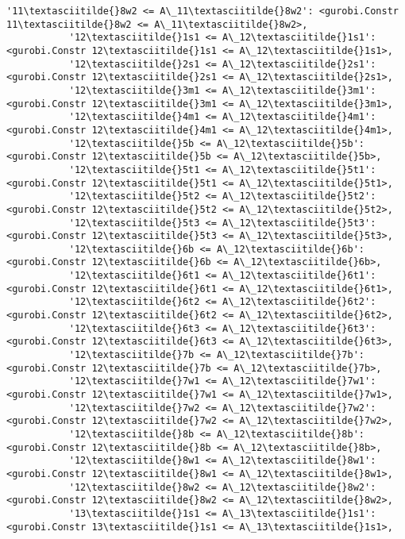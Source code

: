 \documentclass[11pt]{article}
\begin{document}
\begin{Verbatim}[commandchars=\\\{\}]
           '11\textasciitilde{}8w2 <= A\_11\textasciitilde{}8w2': <gurobi.Constr 11\textasciitilde{}8w2 <= A\_11\textasciitilde{}8w2>,
           '12\textasciitilde{}1s1 <= A\_12\textasciitilde{}1s1': <gurobi.Constr 12\textasciitilde{}1s1 <= A\_12\textasciitilde{}1s1>,
           '12\textasciitilde{}2s1 <= A\_12\textasciitilde{}2s1': <gurobi.Constr 12\textasciitilde{}2s1 <= A\_12\textasciitilde{}2s1>,
           '12\textasciitilde{}3m1 <= A\_12\textasciitilde{}3m1': <gurobi.Constr 12\textasciitilde{}3m1 <= A\_12\textasciitilde{}3m1>,
           '12\textasciitilde{}4m1 <= A\_12\textasciitilde{}4m1': <gurobi.Constr 12\textasciitilde{}4m1 <= A\_12\textasciitilde{}4m1>,
           '12\textasciitilde{}5b <= A\_12\textasciitilde{}5b': <gurobi.Constr 12\textasciitilde{}5b <= A\_12\textasciitilde{}5b>,
           '12\textasciitilde{}5t1 <= A\_12\textasciitilde{}5t1': <gurobi.Constr 12\textasciitilde{}5t1 <= A\_12\textasciitilde{}5t1>,
           '12\textasciitilde{}5t2 <= A\_12\textasciitilde{}5t2': <gurobi.Constr 12\textasciitilde{}5t2 <= A\_12\textasciitilde{}5t2>,
           '12\textasciitilde{}5t3 <= A\_12\textasciitilde{}5t3': <gurobi.Constr 12\textasciitilde{}5t3 <= A\_12\textasciitilde{}5t3>,
           '12\textasciitilde{}6b <= A\_12\textasciitilde{}6b': <gurobi.Constr 12\textasciitilde{}6b <= A\_12\textasciitilde{}6b>,
           '12\textasciitilde{}6t1 <= A\_12\textasciitilde{}6t1': <gurobi.Constr 12\textasciitilde{}6t1 <= A\_12\textasciitilde{}6t1>,
           '12\textasciitilde{}6t2 <= A\_12\textasciitilde{}6t2': <gurobi.Constr 12\textasciitilde{}6t2 <= A\_12\textasciitilde{}6t2>,
           '12\textasciitilde{}6t3 <= A\_12\textasciitilde{}6t3': <gurobi.Constr 12\textasciitilde{}6t3 <= A\_12\textasciitilde{}6t3>,
           '12\textasciitilde{}7b <= A\_12\textasciitilde{}7b': <gurobi.Constr 12\textasciitilde{}7b <= A\_12\textasciitilde{}7b>,
           '12\textasciitilde{}7w1 <= A\_12\textasciitilde{}7w1': <gurobi.Constr 12\textasciitilde{}7w1 <= A\_12\textasciitilde{}7w1>,
           '12\textasciitilde{}7w2 <= A\_12\textasciitilde{}7w2': <gurobi.Constr 12\textasciitilde{}7w2 <= A\_12\textasciitilde{}7w2>,
           '12\textasciitilde{}8b <= A\_12\textasciitilde{}8b': <gurobi.Constr 12\textasciitilde{}8b <= A\_12\textasciitilde{}8b>,
           '12\textasciitilde{}8w1 <= A\_12\textasciitilde{}8w1': <gurobi.Constr 12\textasciitilde{}8w1 <= A\_12\textasciitilde{}8w1>,
           '12\textasciitilde{}8w2 <= A\_12\textasciitilde{}8w2': <gurobi.Constr 12\textasciitilde{}8w2 <= A\_12\textasciitilde{}8w2>,
           '13\textasciitilde{}1s1 <= A\_13\textasciitilde{}1s1': <gurobi.Constr 13\textasciitilde{}1s1 <= A\_13\textasciitilde{}1s1>,

\end{Verbatim}
\end{document}
